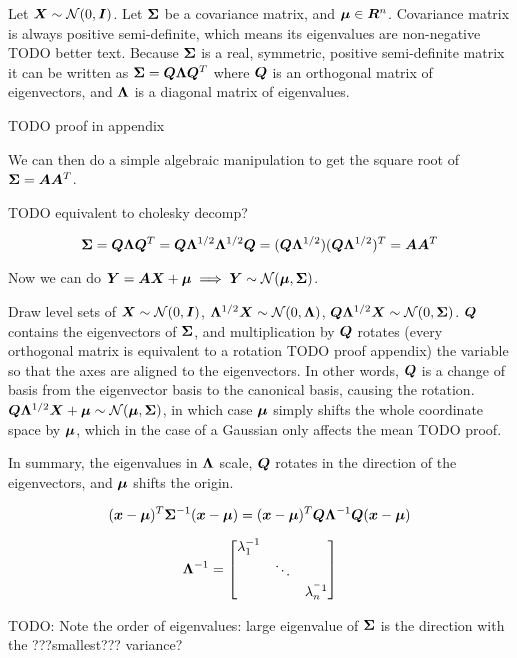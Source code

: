 \begin{tcolorbox}
    Let ${\bm{X}} \sim {\mathcal{N}}(0, {\bm{I}})$. Let ${\bm{\Sigma}}$ be a covariance matrix, and ${\bm{\mu}} \in {\bm{R}}^n$. Covariance matrix is always positive semi-definite, which means its eigenvalues are non-negative {TODO better text}. Because ${\bm{\Sigma}}$ is a real, symmetric, positive semi-definite matrix it can be written as ${\bm{\Sigma}} = {\bm{Q}} {\bm{\Lambda}} {\bm{Q}}^T$ where ${\bm{Q}}$ is an orthogonal matrix of eigenvectors, and ${\bm{\Lambda}}$ is a diagonal matrix of eigenvalues.
    
    TODO proof in appendix
    
    We can then do a simple algebraic manipulation to get the square root of ${\bm{\Sigma}} = {\bm{A}} {\bm{A}}^T$. 
    
    TODO equivalent to cholesky decomp?
    
    \begin{equation}
        {\bm{\Sigma}} = {\bm{Q}} {\bm{\Lambda}} {\bm{Q}}^T = {\bm{Q}} {\bm{\Lambda}}^{1/2} {\bm{\Lambda}}^{1/2} {\bm{Q}} = ({\bm{Q}} {\bm{\Lambda}}^{1/2}) ({\bm{Q}} {\bm{\Lambda}}^{1/2})^T = {\bm{A}} {\bm{A}}^T
    \end{equation}
    
    Now we can do ${\bm{Y}} = {\bm{A}} {\bm{X}} + {\bm{\mu}} \implies {\bm{Y}} \sim {\mathcal{N}}({\bm{\mu}}, {\bm{\Sigma}})$.
    
    Draw level sets of ${\bm{X}} \sim {\mathcal{N}}(0, {\bm{I}})$, ${\bm{\Lambda}}^{1/2} {\bm{X}} \sim {\mathcal{N}}(0, {\bm{\Lambda}})$, ${\bm{Q}} {\bm{\Lambda}}^{1/2} {\bm{X}} \sim {\mathcal{N}}(0, {\bm{\Sigma}})$. ${\bm{Q}}$ contains the eigenvectors of ${\bm{\Sigma}}$, and multiplication by ${\bm{Q}}$ rotates (every orthogonal matrix is equivalent to a rotation  {TODO proof appendix}) the variable so that the axes are aligned to the eigenvectors. In other words, ${\bm{Q}}$ is a change of basis from the eigenvector basis to the canonical basis, causing the rotation. ${\bm{Q}} {\bm{\Lambda}}^{1/2} {\bm{X}} + {\bm{\mu}} \sim {\mathcal{N}}({\bm{\mu}}, {\bm{\Sigma}})$, in which case ${\bm{\mu}}$ simply shifts the whole coordinate space by ${\bm{\mu}}$, which in the case of a Gaussian only affects the mean {TODO proof}.
    
    In summary, the eigenvalues in ${\bm{\Lambda}}$ scale, ${\bm{Q}}$ rotates in the direction of the eigenvectors, and ${\bm{\mu}}$ shifts the origin.
    
    \begin{equation}
        ({\bm{x}} - {\bm{\mu}})^T {\bm{\Sigma}}^{-1} ({\bm{x}} - {\bm{\mu}}) = ({\bm{x}} - {\bm{\mu}})^T {\bm{Q}} {\bm{\Lambda}}^{-1} {\bm{Q}} ({\bm{x}} - {\bm{\mu}})
    \end{equation}
    
    \begin{equation}
        {\bm{\Lambda}}^{-1} = \begin{bmatrix}
            \lambda_1^{-1} & & \\
            & \ddots & \\
            & & \lambda_n^{^-1}
        \end{bmatrix}
    \end{equation}
    
    TODO: Note the order of eigenvalues: large eigenvalue of ${\bm{\Sigma}}$ is the direction with the ???smallest??? variance?
\end{tcolorbox}


